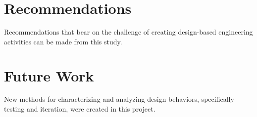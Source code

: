 \section{Recommendations } \label{sec:recommendations}

Recommendations that bear on the challenge of creating design-based engineering activities can be made from this study. 


\section{Future Work}

New methods for characterizing and analyzing design behaviors, specifically testing and iteration, were created in this project. 
